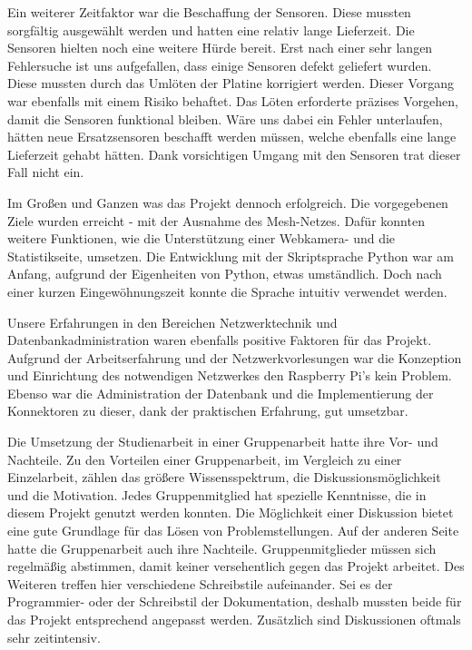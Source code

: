 	Ein weiterer Zeitfaktor war die Beschaffung der Sensoren. Diese mussten sorgfältig ausgewählt werden und hatten eine relativ lange Lieferzeit.
	Die Sensoren hielten noch eine weitere Hürde bereit. Erst nach einer sehr langen Fehlersuche ist uns aufgefallen, dass einige Sensoren defekt geliefert wurden. Diese mussten durch das Umlöten der Platine korrigiert werden. Dieser Vorgang war ebenfalls mit einem Risiko behaftet. Das Löten erforderte präzises Vorgehen, damit die Sensoren funktional bleiben. Wäre uns dabei ein Fehler unterlaufen, hätten neue Ersatzsensoren beschafft werden müssen, welche ebenfalls eine lange Lieferzeit gehabt hätten. Dank vorsichtigen Umgang mit den Sensoren trat dieser Fall nicht ein.
	
	Im Großen und Ganzen was das Projekt dennoch erfolgreich. Die vorgegebenen Ziele wurden erreicht - mit der Ausnahme des Mesh-Netzes. Dafür konnten weitere Funktionen, wie die Unterstützung einer Webkamera- und die Statistikseite, umsetzen. Die Entwicklung mit der Skriptsprache Python war am Anfang, aufgrund der Eigenheiten von Python, etwas umständlich. Doch nach einer kurzen Eingewöhnungszeit konnte die Sprache intuitiv verwendet werden.
	
	Unsere Erfahrungen in den Bereichen Netzwerktechnik und Datenbankadministration waren ebenfalls positive Faktoren für das Projekt.
	Aufgrund der Arbeitserfahrung und der Netzwerkvorlesungen war die Konzeption und Einrichtung des notwendigen Netzwerkes den Raspberry Pi's kein Problem.  
	Ebenso war die Administration der Datenbank und die Implementierung der Konnektoren zu dieser, dank der praktischen Erfahrung, gut umsetzbar.
	
	Die Umsetzung der Studienarbeit in einer Gruppenarbeit hatte ihre Vor- und Nachteile. Zu den Vorteilen einer Gruppenarbeit, im Vergleich zu einer Einzelarbeit, zählen das größere Wissensspektrum, die Diskussionsmöglichkeit und die Motivation. Jedes Gruppenmitglied hat spezielle Kenntnisse, die in diesem Projekt genutzt werden konnten. Die Möglichkeit einer Diskussion bietet eine gute Grundlage für das Lösen von Problemstellungen. Auf der anderen Seite hatte die Gruppenarbeit auch ihre Nachteile. Gruppenmitglieder müssen sich regelmäßig abstimmen, damit keiner versehentlich gegen das Projekt arbeitet. Des Weiteren treffen hier verschiedene Schreibstile aufeinander. Sei es der Programmier- oder der Schreibstil der Dokumentation, deshalb mussten beide für das Projekt entsprechend angepasst werden. Zusätzlich sind Diskussionen oftmals sehr zeitintensiv.
	
